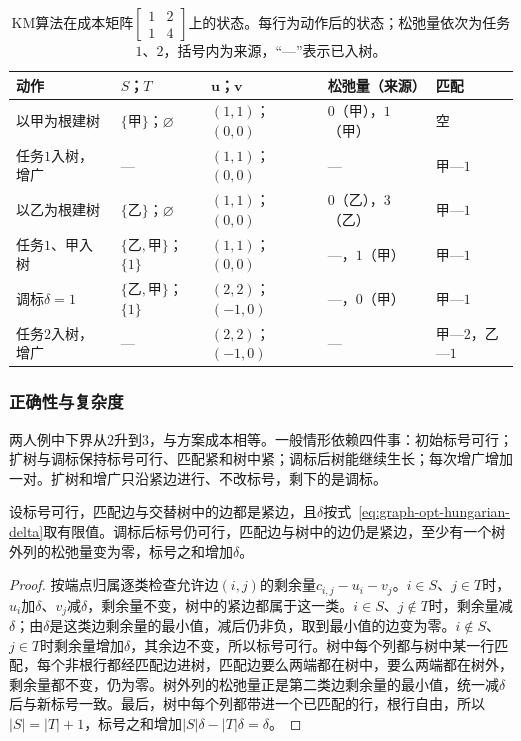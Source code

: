 \begin{table}[!htb]
  \centering\small
  \caption{KM算法在成本矩阵$\left[\begin{smallmatrix}1&2\\1&4\end{smallmatrix}\right]$上的状态。每行为动作后的状态；松弛量依次为任务$1$、$2$，括号内为来源，“—”表示已入树。}
  \label{tab:graph-opt-hungarian-trace}
  \begin{tabular}{@{}lllll@{}}
    \toprule
    动作 & $S$；$T$ & $\bm u$；$\bm v$ & 松弛量（来源） & 匹配 \\
    \midrule
    以甲为根建树 & $\{\text{甲}\}$；$\varnothing$ & $(1,1)$；$(0,0)$ & $0$（甲），$1$（甲） & 空 \\
    任务$1$入树，增广 & — & $(1,1)$；$(0,0)$ & — & 甲—$1$ \\
    以乙为根建树 & $\{\text{乙}\}$；$\varnothing$ & $(1,1)$；$(0,0)$ & $0$（乙），$3$（乙） & 甲—$1$ \\
    任务$1$、甲入树 & $\{\text{乙},\text{甲}\}$；$\{1\}$ & $(1,1)$；$(0,0)$ & —，$1$（甲） & 甲—$1$ \\
    调标$\delta=1$ & $\{\text{乙},\text{甲}\}$；$\{1\}$ & $(2,2)$；$(-1,0)$ & —，$0$（甲） & 甲—$1$ \\
    任务$2$入树，增广 & — & $(2,2)$；$(-1,0)$ & — & 甲—$2$，乙—$1$ \\
    \bottomrule
  \end{tabular}
\end{table}

\subsubsection{正确性与复杂度}

两人例中下界从$2$升到$3$，与方案成本相等。一般情形依赖四件事：初始标号可行；扩树与调标保持标号可行、匹配紧和树中紧；调标后树能继续生长；每次增广增加一对。扩树和增广只沿紧边进行、不改标号，剩下的是调标。

\begin{lemma}[调标的效果]
设标号可行，匹配边与交替树中的边都是紧边，且$\delta$按式~\eqref{eq:graph-opt-hungarian-delta}取有限值。调标后标号仍可行，匹配边与树中的边仍是紧边，至少有一个树外列的松弛量变为零，标号之和增加$\delta$。
\end{lemma}

\begin{proof}
按端点归属逐类检查允许边$(i,j)$的剩余量$c_{i,j}-u_i-v_j$。$i\in S$、$j\in T$时，$u_i$加$\delta$、$v_j$减$\delta$，剩余量不变，树中的紧边都属于这一类。$i\in S$、$j\notin T$时，剩余量减$\delta$；由$\delta$是这类边剩余量的最小值，减后仍非负，取到最小值的边变为零。$i\notin S$、$j\in T$时剩余量增加$\delta$，其余边不变，所以标号可行。树中每个列都与树中某一行匹配，每个非根行都经匹配边进树，匹配边要么两端都在树中，要么两端都在树外，剩余量都不变，仍为零。树外列的松弛量正是第二类边剩余量的最小值，统一减$\delta$后与新标号一致。最后，树中每个列都带进一个已匹配的行，根行自由，所以$|S|=|T|+1$，标号之和增加$|S|\delta-|T|\delta=\delta$。
\end{proof}

